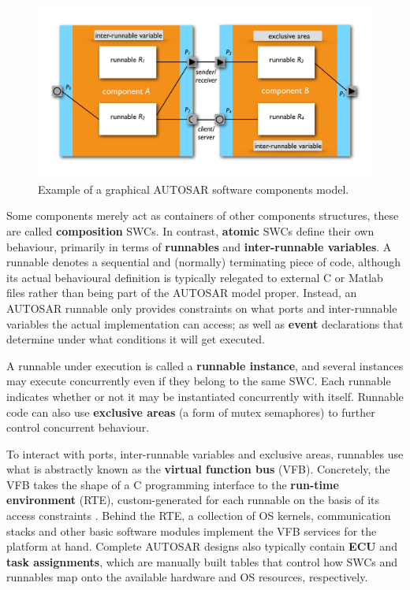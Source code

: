 \documentclass[10pt,conference]{IEEEtran}
\begin{document}
\begin{figure}
\includegraphics[page=1,width=\textwidth]{Fig}
\caption{\label{fig:model}{Example of a graphical AUTOSAR software components model.}}
\end{figure}


Some components merely act as containers of other components structures, these are called \textbf{composition} SWCs. In contrast, \textbf{atomic} SWCs define their own behaviour, primarily in terms of \textbf{runnables} and \textbf{inter-runnable variables}. A runnable denotes a sequential and (normally) terminating piece of code, although its actual behavioural definition is typically relegated to external C or Matlab files rather than being part of the AUTOSAR model proper. Instead, an AUTOSAR runnable only provides constraints on what ports and inter-runnable variables the actual implementation can access; as well as \textbf{event} declarations that determine under what conditions it will get executed.

A runnable under execution is called a \textbf{runnable instance}, and several instances may execute concurrently even if they belong to the same SWC. Each runnable indicates whether or not it may be instantiated concurrently with itself. Runnable code can also use \textbf{exclusive areas} (a form of mutex semaphores) to further control concurrent behaviour.

To interact with ports, inter-runnable variables and exclusive areas, runnables use what is abstractly known as the \textbf{virtual function bus} (VFB). Concretely, the VFB takes the shape of a C programming interface to the \textbf{run-time environment} (RTE), custom-generated for each runnable on the basis of its access constraints \cite{AR:RTE}. Behind the RTE, a collection of OS kernels, communication stacks and other basic software modules implement the VFB services for the platform at hand. Complete AUTOSAR designs also typically contain \textbf{ECU} and \textbf{task assignments}, which are manually built tables that control how SWCs and runnables map onto the available hardware and OS resources, respectively.
\end{document}
